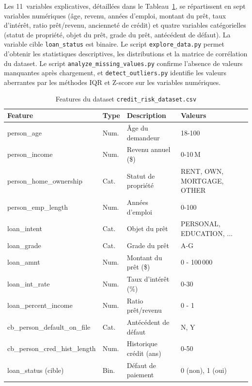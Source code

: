 \documentclass[12pt,a4paper,openany]{report}
\newcommand{\file}[1]{\texttt{#1}}
\begin{document}
Les 11~variables explicatives, détaillées dans le Tableau~\ref{tab:features}, se répartissent en sept variables numériques (âge, revenu, années d'emploi, montant du prêt, taux d'intérêt, ratio prêt/revenu, ancienneté de crédit) et quatre variables catégorielles (statut de propriété, objet du prêt, grade du prêt, antécédent de défaut). La variable cible \texttt{loan\_status} est binaire. Le script \file{explore\_data.py} permet d'obtenir les statistiques descriptives, les distributions et la matrice de corrélation du dataset. Le script \file{analyze\_missing\_values.py} confirme l'absence de valeurs manquantes après chargement, et \file{detect\_outliers.py} identifie les valeurs aberrantes par les méthodes IQR et Z-score sur les variables numériques.

\begin{table}[H]
    \centering
    \small
    \caption{Features du dataset \texttt{credit\_risk\_dataset.csv}}
    \label{tab:features}
    \begin{tabularx}{\textwidth}{>{\ttfamily\scriptsize\raggedright\arraybackslash}p{3.8cm} p{0.8cm} X p{2.4cm}}
        \toprule
        \textnormal{\textbf{Feature}} & \textbf{Type} & \textbf{Description} & \textbf{Valeurs} \\
        \midrule
        person\_age                  & Num.   & Âge du demandeur           & 18-100 \\
        person\_income               & Num.   & Revenu annuel (\$)         & 0-10\,M \\
        person\_home\_ownership      & Cat.   & Statut de propriété        & RENT, OWN, MORTGAGE, OTHER \\
        person\_emp\_length          & Num.   & Années d'emploi            & 0-100 \\
        loan\_intent                 & Cat.   & Objet du prêt              & PERSONAL, EDUCATION, ... \\
        loan\_grade                  & Cat.   & Grade du prêt              & A-G \\
        loan\_amnt                   & Num.   & Montant du prêt (\$)       & 0 - 100\,000 \\
        loan\_int\_rate              & Num.   & Taux d'intérêt (\%)        & 0-30 \\
        loan\_percent\_income        & Num.   & Ratio prêt/revenu          & 0 - 1 \\
        cb\_person\_default\_on\_file& Cat.   & Antécédent de défaut       & N, Y \\
        cb\_person\_cred\_hist\_length & Num. & Historique crédit (ans)    & 0-50 \\
        \midrule
        loan\_status \textnormal{(cible)} & Bin. & Défaut de paiement     & 0 (non), 1 (oui) \\
        \bottomrule
    \end{tabularx}
\end{table}
\end{document}
